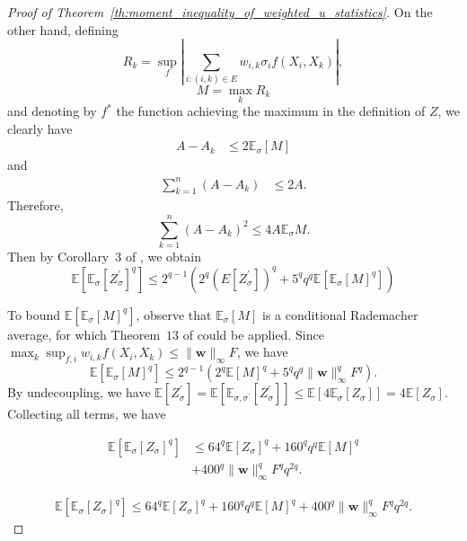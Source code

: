 \documentclass[letterpaper]{article} %
\def\DoubleColumn{}
\def\DoubleColumnEnd{}
\def\SingleColumn{}
\def\SingleColumnEnd{}
\newcommand{\E}{\mathbb{E}}
\newcommand{\weight}{\mathbf{w}}
\newcommand{\rademacher}{\sigma}
\newcommand{\pair}[1]{(#1)}
\begin{document}
\begin{proof}[Proof of Theorem~\ref{th:moment_inequality_of_weighted_u_statistics}]
On the other hand, defining
\[R_k=\sup_f|\sum_{i:\pair{i,k}\in E}w_{i,k}\rademacher_if(X_i,X_k)|,\]
\[M=\max_kR_k\]
and denoting by $f^*$ the function achieving the maximum in the definition of $Z$, we clearly have
\begin{align*}
    A-A_k
    &\le 2\E_\rademacher[M]
\end{align*}
and
\begin{align*}
    \sum_{k=1}^n(A-A_k)
    &\le 2A.
\end{align*}
Therefore,
\[\sum_{k=1}^n(A-A_k)^2\le 4A\E_\rademacher M.\]
Then by Corollary~$3$ of \cite{Boucheron2005}, we obtain
\begin{equation}
    \label{eq:inequality_rademacher_chaos_1}
    \E[\E_\rademacher[Z_\rademacher^\prime]^q]\le 2^{q-1}(2^q(E[Z_\rademacher^\prime])^q+5^qq^q\E[\E_\rademacher[M]^q])
\end{equation}

To bound $\E[\E_\rademacher[M]^q]$, observe that $\E_\rademacher[M]$ is a conditional Rademacher average, for which Theorem~$13$ of \cite{Boucheron2005} could be applied. Since $\max_k\sup_{f,i}w_{i,k}f(X_i,X_k)\le \|\weight{}\|_\infty F$, we have
\begin{equation}
    \label{eq:inequality_rademacher_chaos_2}
    \E[\E_\rademacher[M]^q]\le 2^{q-1}(2^q\E[M]^q+5^qq^q\|\weight{}\|_\infty^qF^q).
\end{equation}
By undecoupling, we have $\E[Z_\rademacher^\prime]=\E[\E_{\rademacher,\rademacher^\prime}[Z_\rademacher^\prime]]\le\E[4\E_\rademacher[Z_\rademacher]]=4\E[Z_\rademacher]$. Collecting all terms, we have
\DoubleColumn
\begin{align*}
    \E[\E_\rademacher[Z_\rademacher]^q]&\le 64^q\E[Z_\rademacher]^q+160^qq^q\E[M]^q\\
    &+400^q\|\weight{}\|_\infty^qF^qq^{2q}.
\end{align*}
\DoubleColumnEnd
\SingleColumn
\begin{align*}
    \E[\E_\rademacher[Z_\rademacher]^q]\le 64^q\E[Z_\rademacher]^q+160^qq^q\E[M]^q+400^q\|\weight{}\|_\infty^qF^qq^{2q}.
\end{align*}
\SingleColumnEnd


\end{proof}
\end{document}
